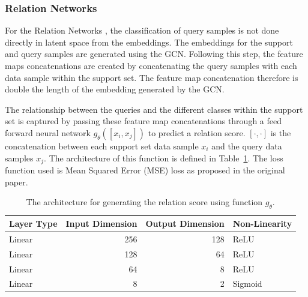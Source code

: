 \subsubsection{Relation Networks}

For the Relation Networks \citep{sung2018learning}, the classification of query samples is not done directly in latent space from the embeddings. The embeddings for the support and query samples are generated using the GCN. Following this step, the feature maps concatenations are created by concatenating the query samples with each data sample within the support set. The feature map concatenation therefore is double the length of the embedding generated by the GCN.

The relationship between the queries and the different classes within the support set is captured by passing these feature map concatenations through a feed forward neural network $g_\theta([x_i, x_j])$ to predict a relation score. $[\cdot,\cdot]$ is the concatenation between each support set data sample $x_i$ and the query data samples $x_j$. The architecture of this function is defined in Table~\ref{table:relation-neural-net}. The loss function used is Mean Squared Error (MSE) loss as proposed in the original paper.

\begin{table}[h]
	\centering
	\begin{tabular}{@{}lrrl@{}}
	\hline
	Layer Type & Input Dimension & Output Dimension & Non-Linearity \\
	\hline
	Linear 	& 256 	& 128 	& ReLU \\
	Linear 	& 128 	& 64 	& ReLU \\
	Linear 	& 64 	& 8 	& ReLU \\
	Linear 	& 8 	& 2 	& Sigmoid \\
	\hline
	\end{tabular}
	\caption{The architecture for generating the relation score using function $g_\theta$.}
	\label{table:relation-neural-net}
\end{table}

